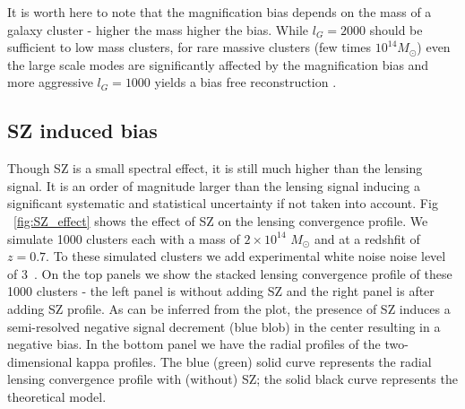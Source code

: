 It is worth here to note that the magnification bias depends on the mass of a galaxy cluster - higher the mass higher the bias. While $l_{G} = 2000$ should be sufficient to low mass clusters, for rare massive clusters (few times $10^{14} M_{\odot}$) even the large scale modes are significantly affected by the magnification bias and more aggressive $l_{G}  = 1000$ yields a bias free reconstruction \citep{hu07}. 
  
 
\subsection{SZ induced bias}
\label{sec_sz_induced_bias}
Though SZ is a small spectral effect, it is still much higher than the lensing signal. 
 It is an order of magnitude larger than the lensing signal inducing a significant systematic and statistical uncertainty if not taken into account. 
Fig ~\ref{fig:SZ_effect} shows the effect of SZ on the lensing convergence profile. 
 We simulate 1000 clusters each with a mass of $2 \times 10^{14}$ $M_{\odot}$ and at a redshfit of $z= 0.7$.
 To these simulated clusters we add experimental white noise noise level of 3\ukam\ 
. On the top panels we show the stacked lensing convergence profile of these 1000 clusters - the left panel is without adding SZ and the right panel is after adding \citet{arnaud10} SZ profile. %
 As can be inferred from the plot, the presence of SZ induces a semi-resolved negative signal decrement (blue blob) in the center resulting in a negative bias.
 In the bottom panel we have the radial profiles of the two-dimensional kappa profiles.
 The blue (green) solid curve represents the radial lensing convergence profile with (without) SZ; the solid black curve represents the theoretical model.


